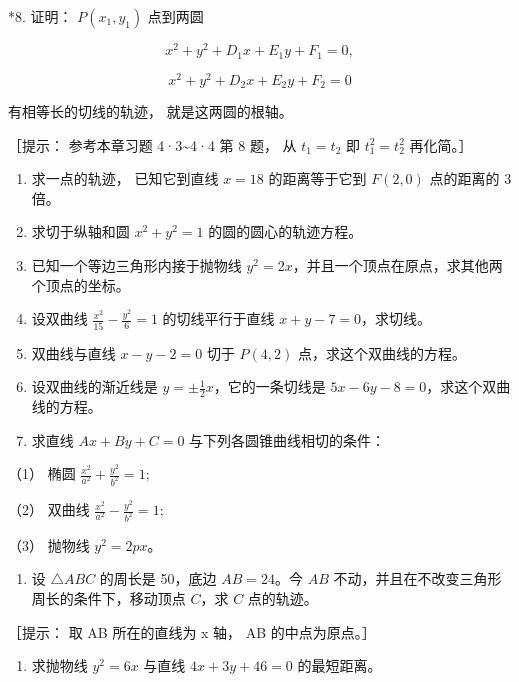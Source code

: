 *8. 证明： \(P(x_{1}, y_{1})\) 点到两圆

\[
x^{2} + y^{2} + D_{1} x + E_{1} y + F_{1} = 0,
\]

\[
x^{2} + y^{2} + D_{2} x + E_{2} y + F_{2} = 0
\]

有相等长的切线的轨迹， 就是这两圆的根轴。

［提示： 参考本章习题 4·3\textasciitilde4·4 第 8 题， 从 \(t_1 = t_2\)
即 \(t_1^2 = t_2^2\) 再化简。］

\begin{enumerate}
\def\labelenumi{\arabic{enumi}.}
\setcounter{enumi}{8}
\item
  求一点的轨迹， 已知它到直线 \(x = 18\) 的距离等于它到 \(F(2,0)\)
  点的距离的 3 倍。
\item
  求切于纵轴和圆 \(x^{2} + y^{2} = 1\) 的圆的圆心的轨迹方程。
\item
  已知一个等边三角形内接于抛物线
  \(y^{2} = 2x\)，并且一个顶点在原点，求其他两个顶点的坐标。
\item
  设双曲线 \(\frac{x^2}{15} - \frac{y^2}{6} = 1\) 的切线平行于直线
  \(x + y - 7 = 0\)，求切线。
\item
  双曲线与直线 \(x - y - 2 = 0\) 切于 \(P(4,2)\)
  点，求这个双曲线的方程。
\item
  设双曲线的渐近线是 \(y = \pm \frac{1}{2} x\)，它的一条切线是
  \(5x - 6y - 8 = 0\)，求这个双曲线的方程。
\item
  求直线 \(Ax + By + C = 0\) 与下列各圆锥曲线相切的条件：
\end{enumerate}

（1） 椭圆 \(\frac{x^{2}}{a^{2}} + \frac{y^{2}}{b^{2}} = 1;\)

（2） 双曲线 \(\frac{x^{2}}{a^{2}} - \frac{y^{2}}{b^{2}} = 1;\)

（3） 抛物线 \(y^{2}=2px\)。

\begin{enumerate}
\def\labelenumi{\arabic{enumi}.}
\setcounter{enumi}{15}
\tightlist
\item
  设 \(\triangle ABC\) 的周长是 50，底边 \(AB = 24\)。今 \(AB\)
  不动，并且在不改变三角形周长的条件下，移动顶点 \(C\)，求 \(C\)
  点的轨迹。
\end{enumerate}

［提示： 取 AB 所在的直线为 x 轴， AB 的中点为原点。］

\begin{enumerate}
\def\labelenumi{\arabic{enumi}.}
\setcounter{enumi}{16}
\tightlist
\item
  求抛物线 \(y^{2} = 6x\) 与直线 \(4x + 3y + 46 = 0\) 的最短距离。
\end{enumerate}

